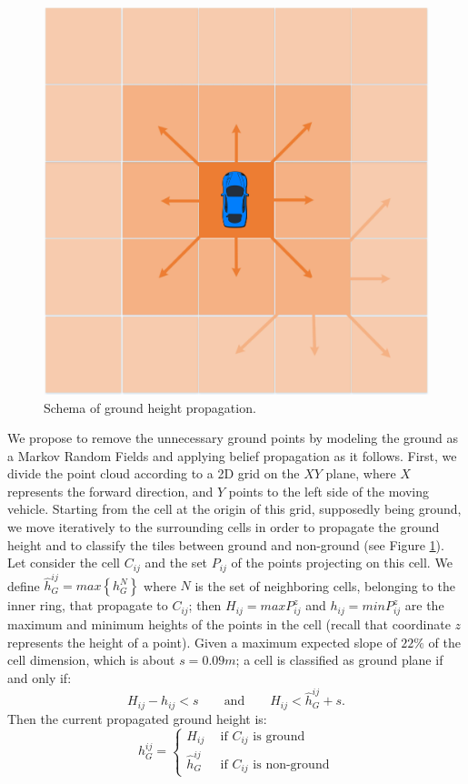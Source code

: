 \begin{figure}[t]
\centering
\includegraphics[width=0.4\columnwidth]{./img/ch-laser/groundpropagation}
\caption{Schema of ground height propagation.}
\label{fig:propag}
\end{figure}

We propose to remove the unnecessary ground points by modeling the ground as a Markov Random Fields and applying belief propagation as it follows. 
First, we divide the point cloud according to a 2D grid on the $XY$ plane, where $X$ represents the forward direction, and $Y$ points to the left side of the moving vehicle. 
Starting from the cell at the origin of this grid, supposedly being ground, we move iteratively to the surrounding cells in order to propagate the ground height and to classify the tiles between ground and non-ground (see Figure \ref{fig:propag}).
Let consider the cell $C_{ij}$ and the set $P_{ij}$ of the points projecting on this cell. We define $\hat{h}_G^{ij} = max\left\{h_G^N\right\}$ where $N$ is the set of neighboring cells, belonging to the inner ring, that propagate to  $C_{ij}$; then $H_{ij} = max{P_{ij}^z}$ and $h_{ij} = min{P_{ij}^z}$ are the maximum and minimum heights of the points in the cell (recall that coordinate $z$ represents the height of a point). 
Given a maximum expected slope of $22\%$ of the cell dimension, which is about $s=0.09m$; a cell is classified as ground plane if and only if:
\begin{equation}
H_{ij} - h_{ij} < s \qquad \text{and} \qquad H_{ij} < \hat{h}_G^{ij} + s.
\end{equation}
Then the current propagated ground height is:
\begin{equation}
   h_G^{ij} =  
      \begin{cases}
               H_{ij} \ \ & \text{if ${C}_{ij}$ is ground}\\
               \hat{h}_G^{ij} \ \ & \text{if ${C}_{ij}$ is non-ground}
        \end{cases}
\end{equation}

